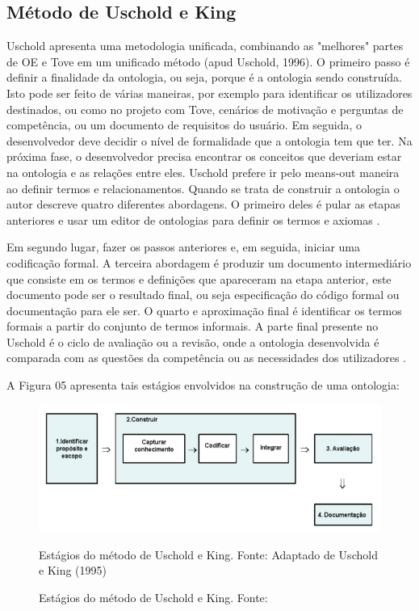 \documentclass[a4paper]{report}
\begin{document}
\subsection{Método de Uschold e King} 
\qquad Uschold apresenta uma metodologia unificada, combinando as "melhores" partes de OE e Tove em um unificado método (apud Uschold, 1996). O primeiro passo é definir a finalidade da ontologia, ou seja, porque é a ontologia sendo construída. Isto pode ser feito de várias maneiras, por exemplo para identificar os utilizadores destinados, ou como no projeto com Tove, cenários de motivação e perguntas de competência, ou um documento de requisitos do usuário. Em seguida, o desenvolvedor deve decidir o nível de formalidade que a ontologia tem que ter. Na próxima fase, o desenvolvedor precisa encontrar os conceitos que deveriam estar na ontologia e as relações entre eles. Uschold prefere ir pelo means-out maneira ao definir termos e relacionamentos. Quando se trata de construir a ontologia o autor descreve quatro diferentes abordagens. O primeiro deles é pular as etapas anteriores e usar um editor de ontologias para definir os termos e axiomas \cite{SeveralAuthorUFF:2011}. 

Em segundo lugar, fazer os passos anteriores e, em seguida, iniciar uma codificação formal. A terceira abordagem é produzir um documento intermediário que consiste em os termos e definições que apareceram na etapa anterior, este documento pode ser o resultado final, ou seja especificação do código formal ou documentação para ele ser. O quarto e aproximação final é identificar os termos formais a partir do conjunto de termos informais. A parte final presente no Uschold é o ciclo de avaliação ou a revisão, onde a ontologia desenvolvida é comparada com as questões da competência ou as necessidades dos utilizadores \cite{SeveralAuthor:2011}. 

A Figura 05 apresenta tais estágios envolvidos na construção de uma ontologia:

\begin{figure}[h] 
\centering %
\includegraphics[scale=0.7]{Figuras/5.png} %
\caption{Estágios do método de Uschold e King.
Fonte: Adaptado de Uschold e King (1995)}
\caption[Estágios do método de Uschold e King]{Estágios do método de Uschold e King. Fonte: \cite{DanielaLucas:2008}}
\end{figure}
\end{document}
